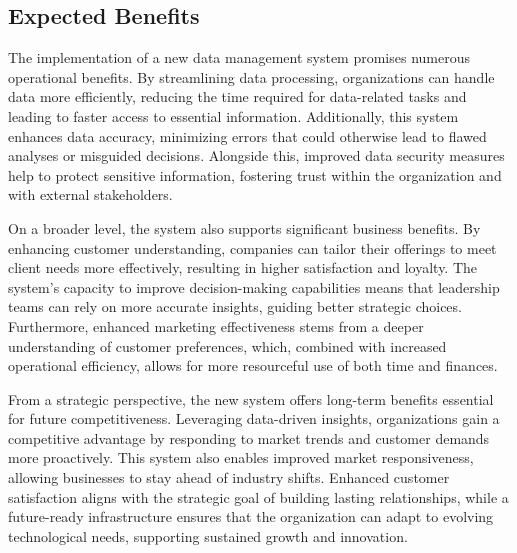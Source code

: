 \subsection{Expected Benefits}
The implementation of a new data management system promises numerous operational benefits. By
streamlining data processing, organizations can handle data more efficiently, reducing the time
required for data-related tasks and leading to faster access to essential information. Additionally,
this system enhances data accuracy, minimizing errors that could otherwise lead to flawed analyses
or misguided decisions. Alongside this, improved data security measures help to protect sensitive
information, fostering trust within the organization and with external stakeholders.

On a broader level, the system also supports significant business benefits. By enhancing customer
understanding, companies can tailor their offerings to meet client needs more effectively, resulting
in higher satisfaction and loyalty. The system's capacity to improve decision-making capabilities
means that leadership teams can rely on more accurate insights, guiding better strategic choices.
Furthermore, enhanced marketing effectiveness stems from a deeper understanding of customer
preferences, which, combined with increased operational efficiency, allows for more resourceful use
of both time and finances.

From a strategic perspective, the new system offers long-term benefits essential for future
competitiveness. Leveraging data-driven insights, organizations gain a competitive advantage by
responding to market trends and customer demands more proactively. This system also enables improved
market responsiveness, allowing businesses to stay ahead of industry shifts. Enhanced customer
satisfaction aligns with the strategic goal of building lasting relationships, while a future-ready
infrastructure ensures that the organization can adapt to evolving technological needs, supporting
sustained growth and innovation.
